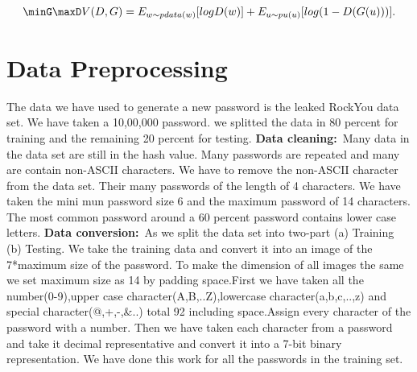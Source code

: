 \documentclass[runningheads]{llncs}
\begin{document}
\textbf{\[ \minG  \maxD  V (D, G)=E _{w \sim pdata(w)}[log D(w)] + E _{u \sim p u(u)} [log(1-D(G(u)))]. \]}


\section{Data Preprocessing}
The data we have used to generate a new password is the leaked RockYou data set. We have taken a 10,00,000 password. we splitted the data in 80 percent for training and the remaining 20 percent for testing.
\newline
\hfill \break
\textbf{Data cleaning:}~Many data in the data set are still in the hash value. Many passwords are repeated and many are contain non-ASCII characters. We have to remove the non-ASCII character from the data set. Their many passwords of the length of 4 characters. We have taken the mini mun password size 6 and the maximum password of 14 characters. The most common password around a 60 percent password contains lower case letters.
\newline
\hfill \break
\textbf{Data conversion:}~As we split the data set into two-part (a) Training (b) Testing. We take the training data and convert it into an image of the 7*maximum size of the password. To make the dimension of all images the same we set maximum size as 14 by padding space.First we have taken all the number(0-9),upper case character(A,B,..Z),lowercase character(a,b,c,..,z) and special character(@,+,-,&..) total 92 including space.Assign every character of the password with a number. Then we have taken each character from a password and take it decimal representative and convert it into a 7-bit binary representation. We have done this work for all the passwords in the training set.
\end{document}
